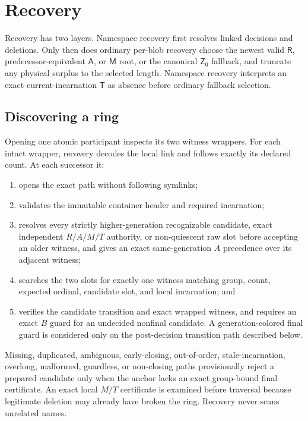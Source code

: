 \documentclass[10pt,twocolumn]{article}
\theoremstyle{remark}
\newcommand{\Root}{\mathsf{R}}
\newcommand{\Materialized}{\mathsf{M}}
\newcommand{\Tombstone}{\mathsf{T}}
\newcommand{\Abort}{\mathsf{A}}
\newcommand{\Zero}{\mathsf{Z}}
\begin{document}
\section{Recovery}

Recovery has two layers. Namespace recovery first resolves linked decisions and deletions. Only
then does ordinary per-blob recovery choose the newest valid $\Root$, predecessor-equivalent
$\Abort$, or $\Materialized$ root, or the canonical $\Zero_0$ fallback, and truncate any physical
surplus to the selected length. Namespace recovery interprets an exact current-incarnation
$\Tombstone$ as absence before ordinary fallback selection.

\subsection{Discovering a ring}

Opening one atomic participant inspects its two witness wrappers. For each intact wrapper, recovery
decodes the local link and follows exactly its declared count. At each successor it:
\begin{enumerate}
  \item opens the exact path without following symlinks;
  \item validates the immutable container header and required incarnation;
  \item resolves every strictly higher-generation recognizable candidate, exact independent
  $R/A/M/T$ authority, or non-quiescent raw slot before accepting an older witness, and gives an
  exact same-generation $A$ precedence over its adjacent witness;
  \item searches the two slots for exactly one witness matching group, count, expected ordinal,
  candidate slot, and local incarnation; and
  \item verifies the candidate transition and exact wrapped witness, and requires an exact $B$
  guard for an undecided nonfinal candidate. A generation-colored final guard is considered only
  on the post-decision transition path described below.
\end{enumerate}
Missing, duplicated, ambiguous, early-closing, out-of-order, stale-incarnation, overlong, malformed,
guardless, or non-closing paths provisionally reject a prepared candidate only when the anchor lacks an exact group-bound
final certificate. An exact local $M/T$ certificate is examined before traversal because legitimate
deletion may already have broken the ring. Recovery never scans unrelated names.
\end{document}
